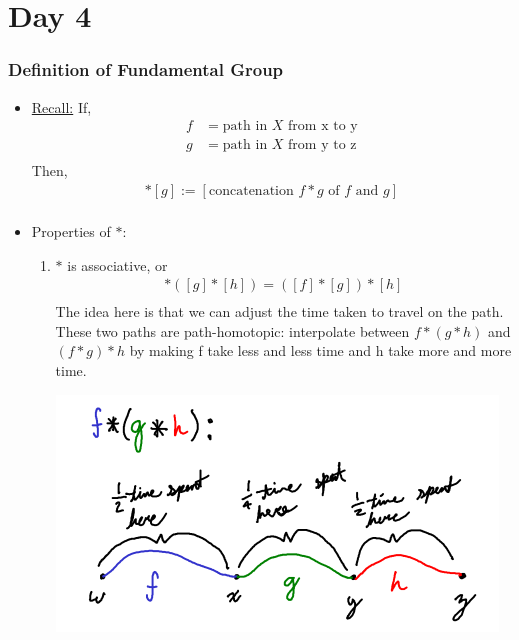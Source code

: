 \section{Day 4}
    \subsubsection{Definition of Fundamental Group}
    \begin{itemize}
        \item \underline{Recall:} If,
            \begin{align*}
                f&=\text{path in $X$ from x to y}\\
                g&=\text{path in $X$ from y to z}\\
            \end{align*}
            Then,
            \begin{align*}
                [f]*[g]:=[\text{concatenation $f*g$ of $f$ and $g$}]\\
            \end{align*}
        \item{Properties of $*$:}
            \begin{enumerate}
                \item $*$ is associative, or
                    \begin{align*}
                        [f]*([g]*[h])=([f]*[g])*[h]\\
                    \end{align*}
                    The idea here is that we can adjust the time taken to travel on the path.
                    These two paths are path-homotopic: interpolate between $f*(g*h)$ and
                    $(f*g)*h$ by making f take less and less time and h take more and more time.\\
            \begin{minipage}[c]{\linewidth}
                \begin{center}
                \includegraphics[]{images/association.png}

\end{center}
\end{minipage}
\end{enumerate}
\end{itemize}
